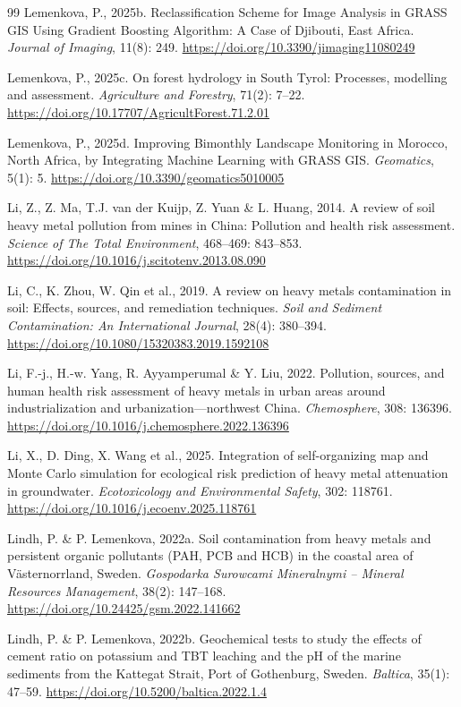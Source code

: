 \documentclass[sn-mathphys-num]{sn-jnl}
\begin{document}
\begin{thebibliography}{99}
Lemenkova, P., 2025b.
Reclassification Scheme for Image Analysis in GRASS GIS Using Gradient
Boosting Algorithm: A Case of Djibouti, East Africa.
\textit{Journal of Imaging}, 11(8): 249.
\url{https://doi.org/10.3390/jimaging11080249}

Lemenkova, P., 2025c.
On forest hydrology in South Tyrol: Processes, modelling and assessment.
\textit{Agriculture and Forestry}, 71(2): 7--22.
\url{https://doi.org/10.17707/AgricultForest.71.2.01}

Lemenkova, P., 2025d.
Improving Bimonthly Landscape Monitoring in Morocco, North Africa, by
Integrating Machine Learning with GRASS GIS\@.
\textit{Geomatics}, 5(1): 5.
\url{https://doi.org/10.3390/geomatics5010005}

Li, Z., Z. Ma, T.J. van der Kuijp, Z. Yuan \& L. Huang, 2014.
A review of soil heavy metal pollution from mines in China: Pollution and
health risk assessment.
\textit{Science of The Total Environment}, 468--469: 843--853.
\url{https://doi.org/10.1016/j.scitotenv.2013.08.090}

Li, C., K. Zhou, W. Qin et al., 2019.
A review on heavy metals contamination in soil: Effects, sources, and
remediation techniques.
\textit{Soil and Sediment Contamination: An International Journal},
28(4): 380--394.
\url{https://doi.org/10.1080/15320383.2019.1592108}

Li, F.-j., H.-w. Yang, R. Ayyamperumal \& Y. Liu, 2022.
Pollution, sources, and human health risk assessment of heavy metals in urban
areas around industrialization and urbanization---northwest China.
\textit{Chemosphere}, 308: 136396.
\url{https://doi.org/10.1016/j.chemosphere.2022.136396}

Li, X., D. Ding, X. Wang et al., 2025.
Integration of self-organizing map and Monte Carlo simulation for ecological
risk prediction of heavy metal attenuation in groundwater.
\textit{Ecotoxicology and Environmental Safety}, 302: 118761.
\url{https://doi.org/10.1016/j.ecoenv.2025.118761}

Lindh, P. \& P. Lemenkova, 2022a.
Soil contamination from heavy metals and persistent organic pollutants
(PAH, PCB and HCB) in the coastal area of V\"{a}sternorrland, Sweden.
\textit{Gospodarka Surowcami Mineralnymi -- Mineral Resources Management},
38(2): 147--168.
\url{https://doi.org/10.24425/gsm.2022.141662}

Lindh, P. \& P. Lemenkova, 2022b.
Geochemical tests to study the effects of cement ratio on potassium and TBT
leaching and the pH of the marine sediments from the Kattegat Strait, Port of
Gothenburg, Sweden.
\textit{Baltica}, 35(1): 47--59.
\url{https://doi.org/10.5200/baltica.2022.1.4}


\end{thebibliography}
\end{document}
